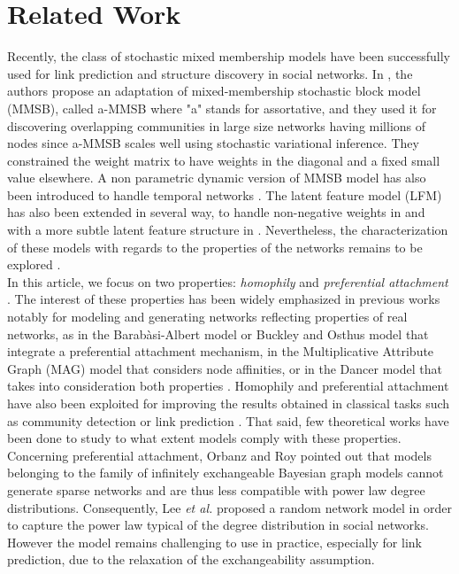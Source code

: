 \section{Related Work}
\label{sec:rel-work}

Recently,  the class of stochastic mixed membership models have been successfully used for link prediction and structure discovery in social networks.  In \cite{AMMSB}, the authors  propose an adaptation of mixed-membership stochastic block model (MMSB), called a-MMSB where "a" stands for assortative, and they used it for discovering overlapping communities in large size networks having millions of nodes since a-MMSB  scales well using stochastic variational inference. They constrained the weight matrix to have weights in the diagonal and a fixed small value elsewhere. A non parametric dynamic version of MMSB model has also been introduced to  handle temporal networks \cite{fan2015dynamic}. The latent feature model (LFM) has also been extended in several way, to handle non-negative weights in \cite{IMRM} and with a more subtle latent feature structure in \cite{ILAM}. Nevertheless, the characterization of these models with regards to the properties of the networks remains to be explored \cite{jacobs2014unified}. ~\\

In this article, we focus on two properties:  \textit{homophily} and \textit{preferential attachment} \cite{Newman2010, Barabasi2003}. The interest of these properties has been widely emphasized in previous works notably for modeling and generating networks reflecting properties of real networks, as in the Barab\`asi-Albert model \cite{albert2002statistical} or Buckley and Osthus model \cite{Buckley2001} that integrate a preferential attachment mechanism, in the Multiplicative Attribute Graph (MAG) model \cite{Kim2012} that considers node affinities, or in the Dancer model that takes into consideration both properties \cite{Largeron2017}. Homophily and preferential attachment have also  been exploited for improving the results obtained in classical tasks such as community detection \cite{Ciglan2013,Zhang2016} or link prediction \cite{Aiello2012,Zeng2016}. That said, few theoretical works have been done to study to what extent models comply with these properties. ~\\

Concerning preferential attachment, Orbanz and Roy \cite{orbanz2015bayesian} pointed out that models belonging to the family of infinitely exchangeable Bayesian graph models cannot generate sparse networks and are thus less compatible with power law degree distributions. Consequently, Lee \textit{et al.} \cite{Lee2015} proposed a random network model in order to capture the power law typical of the degree distribution in social networks. However the model remains challenging to use in practice, especially for link prediction, due to the relaxation of the exchangeability assumption.~\\

